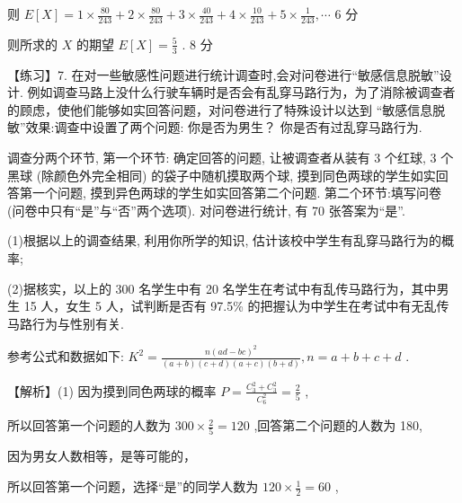 \documentclass[10pt]{article}
\newcommand*\circled[1]{\tikz[baseline=(char.base)]{\node[shape=circle,draw,inner sep=1.5pt] (char) {\small #1};}}
\begin{document}
则 \(E\left\lbrack  X\right\rbrack   = 1 \times  \frac{80}{243} + 2 \times  \frac{80}{243} + 3 \times  \frac{40}{243} + 4 \times  \frac{10}{243} + 5 \times  \frac{1}{243},\cdots\) 6 分

则所求的 \(X\) 的期望 \(E\left\lbrack  X\right\rbrack   = \frac{5}{3}\) . 8 分

【练习】7. 在对一些敏感性问题进行统计调查时,会对问卷进行“敏感信息脱敏”设计. 例如调查马路上没什么行驶车辆时是否会有乱穿马路行为，为了消除被调查者的顾虑，使他们能够如实回答问题，对问卷进行了特殊设计以达到 “敏感信息脱敏”效果:调查中设置了两个问题: \circled{1}  你是否为男生？ \circled{2} 你是否有过乱穿马路行为.

调查分两个环节, 第一个环节: 确定回答的问题, 让被调查者从装有 3 个红球, 3 个黑球 (除颜色外完全相同) 的袋子中随机摸取两个球, 摸到同色两球的学生如实回答第一个问题, 摸到异色两球的学生如实回答第二个问题. 第二个环节:填写问卷 (问卷中只有“是”与“否”两个选项). 对问卷进行统计, 有 70 张答案为“是”.

(1)根据以上的调查结果, 利用你所学的知识, 估计该校中学生有乱穿马路行为的概率;

(2)据核实，以上的 300 名学生中有 20 名学生在考试中有乱传马路行为，其中男生 15 人，女生 5 人，试判断是否有 97.5\% 的把握认为中学生在考试中有无乱传马路行为与性别有关.

参考公式和数据如下: \({K}^{2} = \frac{n{\left( ad - bc\right) }^{2}}{\left( {a + b}\right) \left( {c + d}\right) \left( {a + c}\right) \left( {b + d}\right) },n = a + b + c + d\) .

\begin{center}
\end{center}

【解析】(1) 因为摸到同色两球的概率 \(P = \frac{{C}_{3}^{2} + {C}_{3}^{2}}{{C}_{6}^{2}} = \frac{2}{5}\) ,

所以回答第一个问题的人数为 \({300} \times  \frac{2}{5} = {120}\) ,回答第二个问题的人数为 180,

因为男女人数相等，是等可能的，

所以回答第一个问题，选择“是”的同学人数为 \({120} \times  \frac{1}{2} = {60}\) ,
\end{document}
